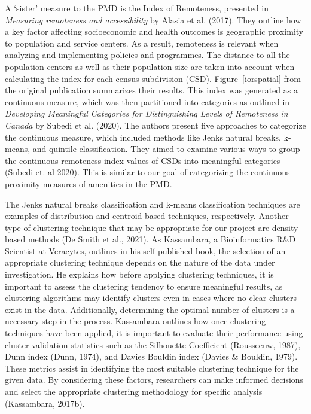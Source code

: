 \documentclass[11pt, a4paper]{article}
\begin{document}
A `sister' measure to the PMD is the Index of Remoteness, presented in \textit{Measuring remoteness and accessibility} by Alasia et al. (2017). They outline how a  key  factor  affecting  socioeconomic  and  health outcomes is geographic proximity to population and service centers. As a result, remoteness is relevant when analyzing and implementing policies and programmes. The distance to all the population centers as well as their population size are taken into account when calculating the index for each census subdivision (CSD). Figure~\ref{iorspatial} from the original publication summarizes their results. This index was generated as a continuous measure, which was then partitioned into categories as outlined in \textit{Developing Meaningful Categories for Distinguishing Levels of Remoteness in Canada} by Subedi et al. (2020).  The authors present five approaches to categorize the continuous measure, which included methods like Jenks natural breaks, k-means, and quintile classification. They aimed to examine various ways to group the continuous remoteness index values of CSDs into meaningful categories (Subedi et.  al 2020). This is similar to our goal of categorizing the continuous proximity measures of amenities in the PMD.
\par
The Jenks natural breaks classification and k-means classification techniques are examples of distribution and centroid based techniques, respectively. Another type of clustering technique that may be appropriate for our project are density based methods (De Smith et al., 2021). As Kassambara, a Bioinformatics R\&D Scientist at Veracytes, outlines in his self-published book, the selection of an appropriate clustering technique depends on the nature of the data under investigation. He explains how before applying clustering techniques, it is important to assess the clustering tendency to ensure meaningful results, as clustering algorithms may identify clusters even in cases where no clear clusters exist in the data. Additionally, determining the optimal number of clusters is a necessary step in the process.  Kassambara outlines how once clustering techniques have been applied, it is important to evaluate their performance using cluster validation statistics such as the Silhouette Coefficient (Rousseeuw, 1987), Dunn index (Dunn, 1974), and Davies Bouldin index (Davies \& Bouldin, 1979). These metrics assist in identifying the most suitable clustering technique for the given data. By considering these factors, researchers can make informed decisions and select the appropriate clustering methodology for specific analysis (Kassambara, 2017b).
\end{document}
